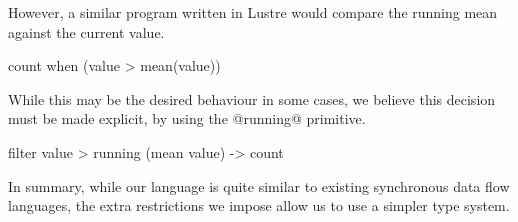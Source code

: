 However, a similar program written in {\sc Lustre} would compare the running mean against the current value.
\begin{code}
count when (value > mean(value))
\end{code}

While this may be the desired behaviour in some cases, we believe this decision must be made explicit, by using the @running@ primitive.
\begin{code}
   filter value > running (mean value)
-> count
\end{code}

In summary, while our language is quite similar to existing synchronous data flow languages, the extra restrictions we impose allow us to use a simpler type system.

